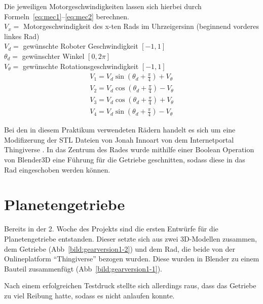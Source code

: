 Die jeweiligen Motorgeschwindigkeiten lassen sich hierbei durch Formeln~\ref{eq:mec1}--\ref{eq:mec2} berechnen.\\

$V_x =$ Motorgeschwindigkeit des x-ten Rads im Uhrzeigersinn (beginnend vorderes linkes Rad)\\
$V_d =$ gewünschte Roboter Geschwindigkeit $[-1, 1]$\\
$\theta_d =$ gewünschter Winkel $[0, 2\pi]$\\
$V_\theta =$ gewünschte Rotationsgeschwindigkeit $[-1, 1]$\\


\begin{align}
	V_1 = V_d\sin{(\theta_d+\frac{\pi}{4})} + V_\theta \label{eq:mec1}\\
	V_2 = V_d\cos{(\theta_d+\frac{\pi}{4})} - V_\theta\\
	V_3 = V_d\cos{(\theta_d+\frac{\pi}{4})} + V_\theta\\
	V_4 = V_d\sin{(\theta_d+\frac{\pi}{4})} - V_\theta \label{eq:mec2}
\end{align} 
\bigskip

Bei den in diesem Praktikum verwendeten Rädern handelt es sich um eine Modifizerung der STL Dateien von Jonah Innoart von dem Internetportal Thingiverse \cite{link:mecanum44}. 
In das Zentrum des Rades wurde mithilfe einer Boolean Operation von Blender3D eine Führung für die Getriebe geschnitten, sodass diese in das Rad eingeschoben werden können.

\section{Planetengetriebe}

Bereits in der 2. Woche des Projekts sind die ersten Entwürfe für die Planetengetriebe entstanden.
Dieser setzte sich aus zwei 3D-Modellen zusammen, dem Getriebe (Abb~\ref{bild:gearversion1-2}) und dem Rad, die beide von der Onlineplatform ``Thingiverse'' bezogen wurden.
Diese wurden in Blender zu einem Bauteil zusammenfügt (Abb~\ref{bild:gearversion1-1}). 

Nach einem erfolgreichen Testdruck stellte sich allerdings raus, dass das Getriebe zu viel Reibung hatte, sodass es nicht anlaufen konnte.


